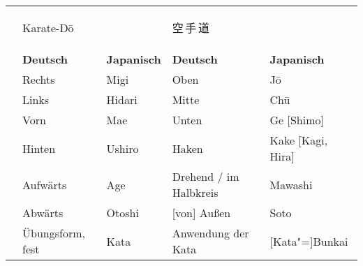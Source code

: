 \begin{tabularx}{\textwidth}{lllll}
		& \multicolumn{2}{l}{Karate-D\={o}}			& {\LARGE \begin{CJK*}{UTF8}{ipxm}空\,手\,道\end{CJK*}}        & \\
		\addlinespace
		\addlinespace
		\addlinespace
		& \textbf{Deutsch} 	& \textbf{Japanisch\quad} 	& \textbf{Deutsch} 								& \textbf{Japanisch}\\
		& Rechts 			& Migi 					& Oben 												& J\={o} \\
		& Links				& Hidari 				& Mitte 											& Ch\={u} \\
		& Vorn 				& Mae 					& Unten 											& Ge [Shimo] \\
		& Hinten 			& Ushiro 				& Haken 											& Kake [Kagi, Hira] \\
		& Aufwärts 			& Age 					& Drehend / im Halbkreis 							& Mawashi\\
		& Abwärts 			& Otoshi 				& [von] Außen 										& Soto \\
		& Übungsform, fest& Kata 					& Anwendung der Kata 								& [Kata"=]Bunkai \\
	\end{tabularx}	
	\null\vfill\null